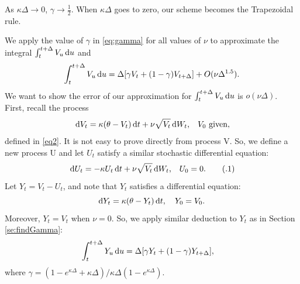 \documentclass{ws-ijfe}
\newcommand\numberthis{\addtocounter{equation}{1}\tag{\theequation}}
\begin{document}
As $\kappa\Delta\rightarrow 0$, $\gamma\rightarrow\frac{1}{2} $.
When $\kappa\Delta$ goes to zero, our scheme becomes the Trapezoidal rule.

We apply the value of $\gamma$ in \eqref{eq:gamma} for all values of $\nu$ to approximate the integral $\int_{t}^{t+\Delta}V_u \,\mathrm{d} u$ and
\begin{equation*}
  \int_{t}^{t+\Delta}V_u\,\mathrm{d} u = \Delta[\gamma V_t+(1-\gamma) V_{t+\Delta}] + O(\nu\Delta^{1.5}).
\end{equation*}
We want to show the error of our approximation for $ \int_{t}^{t+\Delta}V_u\,\mathrm{d} u$ is $o(\nu\Delta)$.
First, recall the process
\begin{equation*}
  \,\mathrm{d} V_t = \kappa(\theta-V_t)\,\mathrm{d} t +\nu\sqrt{V_t}\,\mathrm{d} W_t\text{,} \quad V_0 \text{ given},
\end{equation*}
defined in \eqref{eq2}. It is not easy to prove directly from process V. So, we define a new process U and let $U_t$ satisfy a similar stochastic differential equation:
\begin{equation*}
  \,\d U_t = -\kappa U_t\,\d t + \nu\sqrt{V_t}\,\d W_t\text{,} \quad U_0 = 0.\numberthis\label{appeqnV_t}
\end{equation*}
Let $Y_t=V_t-U_t$, and note that $Y_t$ satisfies a differential equation:
\begin{equation*}
  \mathrm{d} Y_t = \kappa(\theta-Y_t)\,\mathrm{d} t, \quad Y_0 = V_0.
\end{equation*}
Moreover, $Y_t=V_t$ when $\nu = 0$. So, we apply similar deduction to $Y_t$ as in Section \ref{se:findGamma}:
\begin{align*}
   \int^{t+\Delta}_t Y_u\,\d u %
    &= \Delta[\gamma Y_t+(1-\gamma)Y_{t+\Delta}],
\end{align*}
where $\gamma = (1-e^{\kappa\Delta}+\kappa\Delta)\big/\kappa\Delta(1-e^{\kappa\Delta})$.
\end{document}
